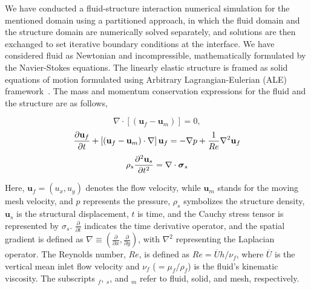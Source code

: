 \documentclass[reprint,a4paper,fleqn]{cas-dc} %
\begin{document}
	We have conducted a fluid-structure interaction numerical simulation for the mentioned domain using a partitioned approach, in which the fluid domain and the structure domain are numerically solved separately, and solutions are then exchanged to set iterative boundary conditions at the interface. We have considered fluid as Newtonian and incompressible, mathematically formulated by the Navier-Stokes equations. The linearly elastic structure is framed as solid equations of motion formulated using Arbitrary Lagrangian-Eulerian (ALE) framework~\cite{Nguyen2010, Slone2002, CampbellPaterson2011}. The mass and momentum conservation expressions for the fluid and the structure are as follows,
	\begin{center}\vspace{-0.5cm}
		\begin{equation}
			\nabla\cdot\left[(\mathbf{u}_f-\mathbf{u}_m)\right] = 0,
		\end{equation}
		\begin{equation}
			{\partial\mathbf{u}_f\over\partial t} + \left[(\mathbf{u}_f-\mathbf{u}_m) \cdot\mathbf{\nabla}\right]\mathbf{u}_f = -\nabla p+\frac{1}{Re}\nabla^2\mathbf{u}_f
		\end{equation}
		\begin{equation}
			\rho_s{\partial^2\mathbf{u}_s\over\partial t^2} = \mathbf{\nabla}\cdot\mathbf{\boldsymbol{\sigma}}_s
		\end{equation}
	\end{center}
	
	Here, $\mathbf{u}_f=(u_x,u_y)$ denotes the flow velocity, while $\mathbf{u}_m$ stands for the moving mesh velocity, and $p$ represents the pressure, $\rho_s$ symbolizes the structure density, $\mathbf{u}_s$ is the structural displacement, $t$ is time, and the Cauchy stress tensor is represented by $\sigma_s$. $\frac{\partial}{\partial t}$ indicates the time derivative operator, and the spatial gradient is defined as $\nabla\equiv\left(\frac{\partial}{\partial x},\frac{\partial}{\partial y}\right)$, with $\nabla^2$ representing the Laplacian operator. The Reynolds number, $Re$, is defined as $Re=\overline{U}h/\nu_f$, where $\overline{U}$ is the vertical mean inlet flow velocity and $\nu_f$ ($=\mu_f/\rho_f$) is the fluid's kinematic viscosity. The subscripts $_f$, $_s$, and $_m$ refer to fluid, solid, and mesh, respectively.
	
\end{document}
